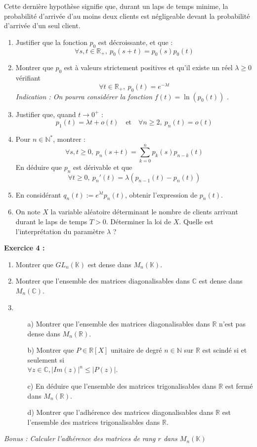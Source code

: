 \documentclass[11pt,a4paper]{article}
\begin{document}
Cette dernière hypothèse signifie que, durant un laps de temps minime, la probabilité d'arrivée d'au moins deux clients est négligeable devant la probabilité d'arrivée d'un seul client.

\begin{enumerate}
\item Justifier que la fonction $p_0$ est décroissante, et que : \[\forall s,t \in \mathbb{R}_+, \ p_0(s+t)=p_0(s)p_0(t)\]
\item Montrer que $p_0$ est à valeurs strictement positives et qu'il existe un réel $\lambda \geq 0$ vérifiant \[\forall t \in \mathbb{R}_+, \ p_0(t) = e^{-\lambda t}\]
\textit{Indication : On pourra considérer la fonction $f(t) = \ln{(p_0(t))}$ }.
\item Justifier que, quand  $t \to 0^+$ : \[p_1(t) = \lambda t + o(t) \ \ \  \text{ et } \ \ \ \forall n \geq 2, \ p_n(t) = o(t)\]
\item Pour $n\in \mathbb{N}^*$, montrer : \[\forall s,t \geq 0, \  p_n(s+t)= \sum_{k=0}^np_k(s)p_{n-k}(t)\] En déduire que $p_n$ est dérivable et que \[\forall t \geq 0, \ p_n'(t)=\lambda(p_{n-1}(t) - p_n(t))\]
\item En considérant $q_n(t) := e^{\lambda t} p_n(t)$, obtenir l'expression de $p_n(t)$.
\item On note $X$ la variable aléatoire déterminant le nombre de clients arrivant durant le laps de temps $T >0$. Déterminer la loi de $X$. Quelle est l'interprétation du paramètre $\lambda$ ? \\
\end{enumerate}

\textbf{Exercice 4 :}
\begin{enumerate}
\item Montrer que $GL_n(\mathbb{K})$ est dense dans $M_n(\mathbb{K})$.
\item Montrer que l'ensemble des matrices diagonalisables dans $\mathbb{C}$ est dense dans $M_n(\mathbb{C})$.
\item 
\begin{itemize}
\item[a)] Montrer que l’ensemble des matrices diagonalisables dans $\mathbb{R}$ n’est pas dense dans $M_n(\mathbb{R})$.
\item[b)] Montrer que $P\in \mathbb{R}[X]$ unitaire de degré $n\in \mathbb{N}$ sur $\mathbb{R}$ est scindé si et seulement si \\ $ \forall z \in \mathbb{C},|Im(z)|^n \leq |P(z)|$.
\item[c)] En déduire que l'ensemble des matrices trigonalisables dans $\mathbb{R}$ est fermé dans $M_n(\mathbb{R})$.
\item[d)]  Montrer que l’adhérence des matrices diagonalisables dans $\mathbb{R}$ est l’ensemble des matrices
trigonalisables dans $\mathbb{R}$.
\end{itemize}
\end{enumerate}
\textit{Bonus : Calculer l'adhérence des matrices de rang $r$ dans $M_n(\mathbb{K})$} \\
\end{document}
